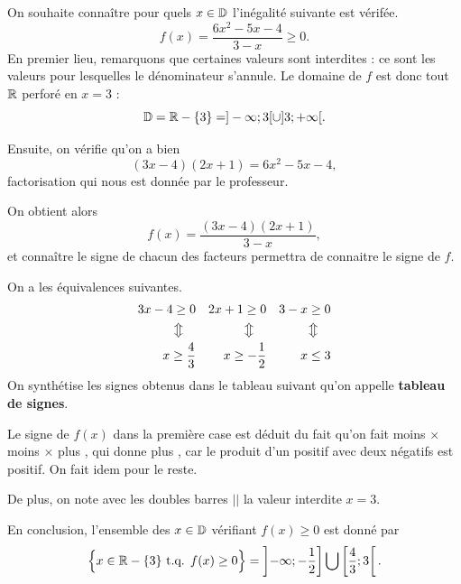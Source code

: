 \documentclass[a4paper, 12pt]{report}
\begin{document}
\begin{rmq}
	On souhaite connaître pour quels $x\in\mathbb{D}$ l'inégalité suivante est vérifée.
		\[ f(x) = \dfrac{6x^2 - 5x - 4}{3-x} \geq 0. \]
	En premier lieu, remarquons que certaines valeurs sont interdites : ce sont les valeurs pour lesquelles le dénominateur s'annule.
	Le domaine de $f$ est donc tout $\mathbb{R}$ perforé en $x=3$ :
		\[ \mathbb{D} = \mathbb{R} - \{3 \} = ]-\infty ; 3[ \cup ]3 ; +\infty[. \]
	
	Ensuite, on vérifie qu'on a bien 
		\[ (3x-4)(2x+1) = 6x^2 - 5x - 4, \]
	factorisation qui nous est donnée par le professeur.
	
	On obtient alors
		\[ f(x) = \dfrac{(3x-4)(2x+1)}{3-x}, \]
	et connaître le signe de chacun des facteurs permettra de connaitre le signe de $f$.
	
	On a les équivalences suivantes.
		\begin{align*}
			3x-4 \geq 0 && 2x+1  \geq 0 && 3-x \geq 0 \\
			\big\Updownarrow\quad && \big\Updownarrow\quad && \big\Updownarrow\quad \\
			x \geq \dfrac43 && x \geq -\dfrac12 && x \leq 3
		\end{align*}
	On synthétise les signes obtenus dans le tableau suivant qu'on appelle \textbf{tableau de signes}.
	
	\begin{center}
	\end{center}
	
	Le signe de $f(x)$ dans la première case est déduit du fait qu'on fait \og moins $\times$ moins $\times$ plus \fg, qui donne \og plus \fg, car le produit d'un positif avec deux négatifs est positif. On fait idem pour le reste.
	
	De plus, on note avec les doubles barres $||$ la valeur interdite $x=3$.
	
	En conclusion, l'ensemble des $x \in \mathbb{D}$ vérifiant $f(x) \geq 0$ est donné par
		\[ \Bigl\{  x \in \mathbb{R}-\{3\} \text{ t.q. } f(x) \geq 0  \Bigr\} = \left]-\infty ; -\dfrac12 \right] \bigcup \left[ \dfrac43 ; 3 \right[. \]
\end{rmq}
\end{document}
